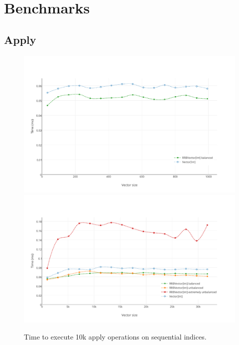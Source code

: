\section{Benchmarks}


\subsection{Apply}

\begin{figure}[h!]
  \centering
  \includegraphics[width=\textwidth]{Benchmarks/Apply_2.pdf}
  \includegraphics[width=\textwidth]{Benchmarks/Apply_3.pdf}
  \label{ApplyBenchmarks}
  \caption{Time to execute 10k apply operations on sequential indices.}
\end{figure}

